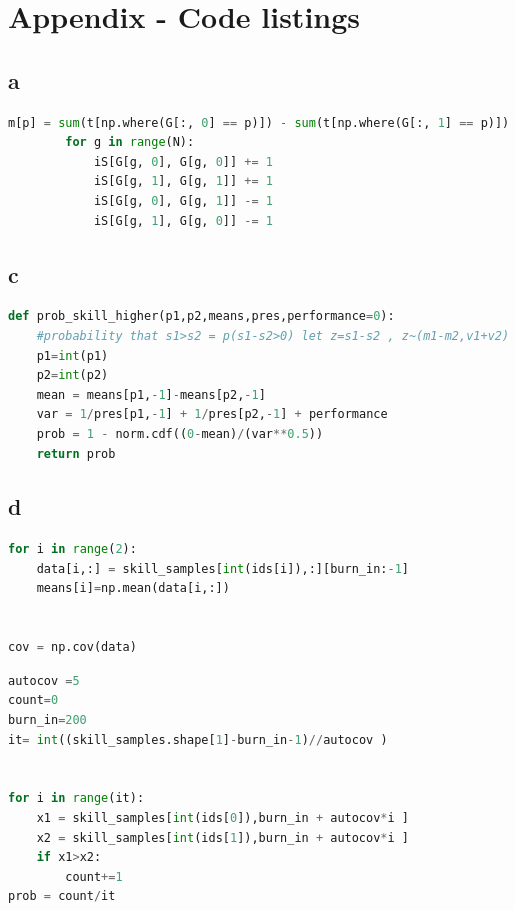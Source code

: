 \documentclass[twoside,twocolumn]{article}
\begin{document}
\section{Appendix - Code listings}
\subsection{a}
\begin{lstlisting}[language=python]
m[p] = sum(t[np.where(G[:, 0] == p)]) - sum(t[np.where(G[:, 1] == p)]) 
        for g in range(N):
            iS[G[g, 0], G[g, 0]] += 1
            iS[G[g, 1], G[g, 1]] += 1
            iS[G[g, 0], G[g, 1]] -= 1
            iS[G[g, 1], G[g, 0]] -= 1
\end{lstlisting}

\subsection{c}
\begin{lstlisting}[language=python]
def prob_skill_higher(p1,p2,means,pres,performance=0):
    #probability that s1>s2 = p(s1-s2>0) let z=s1-s2 , z~(m1-m2,v1+v2)
    p1=int(p1)
    p2=int(p2)
    mean = means[p1,-1]-means[p2,-1]
    var = 1/pres[p1,-1] + 1/pres[p2,-1] + performance
    prob = 1 - norm.cdf((0-mean)/(var**0.5))
    return prob
\end{lstlisting}
\subsection{d}
\begin{lstlisting}[language=python]
for i in range(2):
    data[i,:] = skill_samples[int(ids[i]),:][burn_in:-1]
    means[i]=np.mean(data[i,:])
 

cov = np.cov(data)
\end{lstlisting}
\onecolumn
\begin{lstlisting}[language=python]
autocov =5
count=0
burn_in=200
it= int((skill_samples.shape[1]-burn_in-1)//autocov )


for i in range(it):
    x1 = skill_samples[int(ids[0]),burn_in + autocov*i ]
    x2 = skill_samples[int(ids[1]),burn_in + autocov*i ]
    if x1>x2:
        count+=1
prob = count/it
\end{lstlisting}
\end{document}
